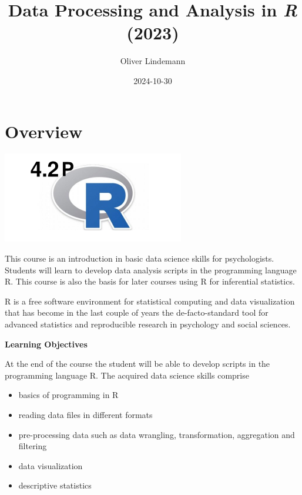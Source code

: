 \documentclass[
]{scrartcl}
\title{Data Processing and Analysis in \emph{R} (2023)}
\author{Oliver Lindemann}
\date{2024-10-30}
\providecommand{\tightlist}{%
  \setlength{\itemsep}{0pt}\setlength{\parskip}{0pt}}
\begin{document}
\maketitle

{
\hypersetup{linkcolor=}
\setcounter{tocdepth}{2}
\tableofcontents
}
\newpage

\section*{Overview}\label{overview}

\begin{center}\includegraphics[width=300px]{images/R-course-logo} \end{center}

This course is an introduction in basic data science skills for psychologists. Students will learn to develop data analysis scripts in the programming language R. This course is also the basis for later courses using R for inferential statistics.

R is a free software environment for statistical computing and data visualization that has become in the last couple of years the de-facto-standard tool for advanced statistics and reproducible research in psychology and social sciences.

\textbf{Learning Objectives}

At the end of the course the student will be able to develop scripts in the programming language R. The acquired data science skills comprise

\begin{itemize}
\tightlist
\item
  basics of programming in R
\item
  reading data files in different formats
\item
  pre-processing data such as data wrangling, transformation, aggregation and filtering
\item
  data visualization
\item
  descriptive statistics
\end{itemize}
\end{document}
